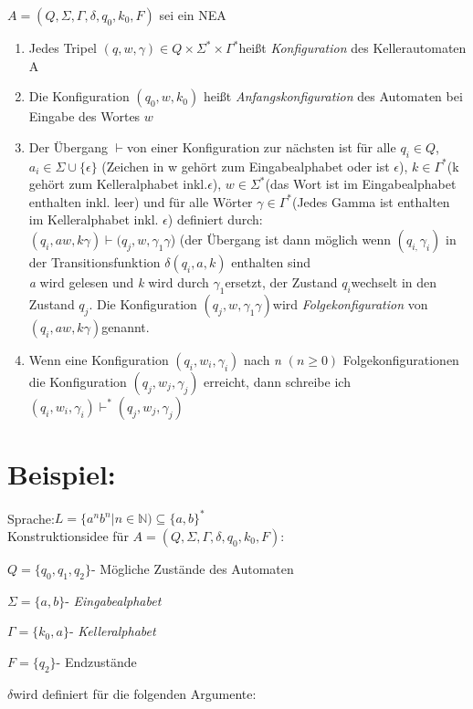 $A=(Q,\Sigma,\Gamma,\delta,q_{0},k_{0},F)$ sei ein NEA
\begin{enumerate}
\item Jedes Tripel $(q,w,\gamma)\in Q\times\Sigma^{*}\times\Gamma^{*}$heißt
\emph{Konfiguration} des Kellerautomaten A
\item Die Konfiguration $(q_{0},w,k_{0})$ heißt \emph{Anfangskonfiguration}
des Automaten bei Eingabe des Wortes $w$
\item Der Übergang $\vdash$von einer Konfiguration zur nächsten ist für
alle $q_{i}\in Q$, $a_{i}\in\Sigma\cup\{\epsilon\}$ (Zeichen in
w gehört zum Eingabealphabet oder ist $\epsilon$), $k\in\Gamma^{*}$(k
gehört zum Kelleralphabet inkl.$\epsilon$), $w\in\Sigma^{*}$(das
Wort ist im Eingabealphabet enthalten inkl. leer) und für alle Wörter
$\gamma\in\Gamma^{*}$(Jedes Gamma ist enthalten im Kelleralphabet
inkl. $\epsilon$) definiert durch:\\
$(q_{i},aw,k\gamma)\vdash(q_{j},w,\gamma_{1}\gamma$) (der Übergang
ist dann möglich wenn $(q_{i,}\gamma_{i})$ in der Transitionsfunktion
$\delta(q_{i},a,k)$ enthalten sind\\
\emph{a} wird gelesen und \emph{k} wird durch $\gamma_{1}$ersetzt,
der Zustand $q_{i}$wechselt in den Zustand $q_{j}$. Die Konfiguration
$(q_{j},w,\gamma_{1}\gamma)$wird \emph{Folgekonfiguration} von $(q_{i},aw,k\gamma)$genannt.
\item Wenn eine Konfiguration $(q_{i},w_{i},\gamma_{i})$ nach \emph{n}
$(n\ge0)$ Folgekonfigurationen die Konfiguration $(q_{j},w_{j},\gamma_{j})$
erreicht, dann schreibe ich $(q_{i},w_{i},\gamma_{i})\vdash^{*}(q_{j},w_{j},\gamma_{j})$
\end{enumerate}

\section*{Beispiel:}

Sprache:$L=\{a^{n}b^{n}|n\in\mathbb{N})\subseteq\{a,b\}^{*}$\\
Konstruktionsidee für $A=(Q,\Sigma,\Gamma,\delta,q_{0},k_{0},F)$:

$Q=\{q_{0},q_{1},q_{2}\}$- Mögliche Zustände des Automaten

$\Sigma=\{a,b\}$- \emph{Eingabealphabet}

$\Gamma=\{k_{0},a\}$- \emph{Kelleralphabet}

$F=\{q_{2}\}$- Endzustände

$\delta$wird definiert für die folgenden Argumente:


